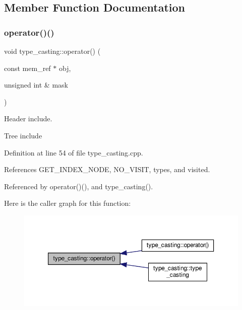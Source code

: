 \subsection{Member Function Documentation}
\mbox{\label{structtype__casting_afbe475bc88d774a048c1b2e5d5250049}} 
\subsubsection{\texorpdfstring{operator()()}{operator()()}\hspace{0.1cm}{\footnotesize\ttfamily [1/2]}}
{\footnotesize\ttfamily void type\+\_\+casting\+::operator() (\begin{DoxyParamCaption}\item[{const mem\+\_\+ref $\ast$}]{obj,  }\item[{unsigned int \&}]{mask }\end{DoxyParamCaption})\hspace{0.3cm}{\ttfamily [override]}}



Header include. 

Tree include 

Definition at line 54 of file type\+\_\+casting.\+cpp.



References G\+E\+T\+\_\+\+I\+N\+D\+E\+X\+\_\+\+N\+O\+DE, N\+O\+\_\+\+V\+I\+S\+IT, types, and visited.



Referenced by operator()(), and type\+\_\+casting().

Here is the caller graph for this function\+:
\nopagebreak
\begin{figure}[H]
\begin{center}
\leavevmode
\includegraphics[width=350pt]{dd/d6d/structtype__casting_afbe475bc88d774a048c1b2e5d5250049_icgraph}
\end{center}
\end{figure}
\mbox{\label{structtype__casting_a463829f253347a18a6275a5c15b40ebf}} 
